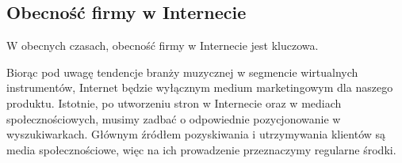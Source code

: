 \documentclass[12pt]{article}
\begin{document}




\subsection{Obecność firmy w Internecie} %


W obecnych czasach, obecność firmy w Internecie jest kluczowa.

Biorąc pod uwagę tendencje branży muzycznej w segmencie wirtualnych instrumentów, Internet będzie wyłącznym medium marketingowym dla naszego produktu.
Istotnie, po utworzeniu stron w Internecie oraz w mediach społecznościowych, musimy zadbać o odpowiednie pozycjonowanie w wyszukiwarkach.
Głównym źródłem pozyskiwania i utrzymywania klientów są media społecznościowe, więc na ich prowadzenie przeznaczymy regularne środki.
\end{document}
